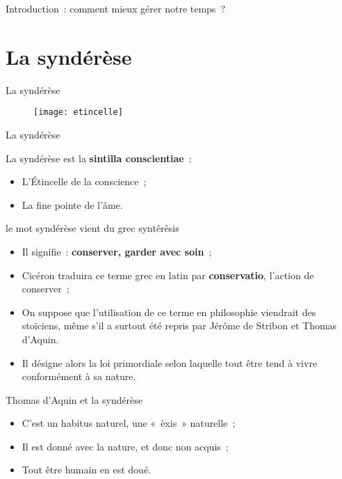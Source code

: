 \documentclass[11pt,xcolor=dvipsname,ignorenonframetext,handout]{beamer}
\begin{document}
\begin{frame}{Introduction~: comment mieux gérer notre temps~?}
\section{La syndérèse}
\begin{frame}{La syndérèse}
    {
        \begin{figure}
          \centering
          \texttt{[image: etincelle]}
        \end{figure}
          }    
\end{frame}
\begin{frame}{La syndérèse}
    \begin{block}{La syndérèse est la \textbf{sintilla conscientiae}~:}
        \begin{itemize}
            \rightskip=0pt\leftskip=0pt 
            \item L'Étincelle de la conscience~;
            \item La fine pointe de l'âme.
        \end{itemize}       
    \end{block}
    \begin{exampleblock}{le mot syndérèse vient du grec syntêrêsis}
        \begin{itemize}
            \rightskip=0pt\leftskip=0pt
            \item Il signifie~: \textbf{conserver, garder avec soin}~;
            \item Cicéron traduira ce terme grec en latin par \textbf{conservatio}, l'action de conserver~;
            \item On suppose que l'utilisation de ce terme en philosophie viendrait des stoïciens, même s'il a surtout été repris par Jérôme de Stribon et Thomas d'Aquin.
            \item Il désigne alors la loi primordiale selon laquelle tout être tend à vivre conformément à sa nature.
        \end{itemize}
    \end{exampleblock}
\end{frame}
\begin{frame}{Thomas d'Aquin et la syndérèse}
   \begin{itemize}
        \rightskip=0pt\leftskip=0pt
        \item C'est un habitus naturel, une «~èxis~» naturelle~;
        \item Il est donné avec la nature, et donc non acquis~;
        \item Tout être humain en est doué.

\end{itemize}
\end{frame}
\end{frame}
\end{document}
